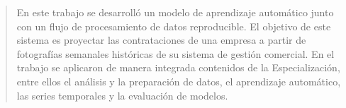 \documentclass[
    11pt,
    spanish,
    singlespacing,
    parskip,
    headsepline,
    bookmarks=true,
    unicode=true,
    pdftoolbar=true,
    pdfmenubar=true,
    pdffitwindow=false,
    colorlinks=true,
    linkcolor=blue,
    citecolor=blue,
    urlcolor=blue
]{MastersDoctoralThesis}
\author{Juan Pablo Skobalski}
\def\textbf#1{#1}%
\begin{document}



\frontmatter %
\pagestyle{plain} %


\begin{abstract}
\addchaptertocentry{\abstractname} %
En este trabajo se desarrolló un modelo de aprendizaje automático junto con un flujo de procesamiento de datos reproducible. El objetivo de este sistema es proyectar las contrataciones de una empresa a partir de fotografías semanales históricas de su sistema de gestión comercial.
\linebreak
En el trabajo se aplicaron de manera integrada contenidos de la Especialización, entre ellos el análisis y la preparación de datos, el aprendizaje automático, las series temporales y la evaluación de modelos.
\end{abstract}




\tableofcontents
\listoffigures
\listoftables


\end{document}
